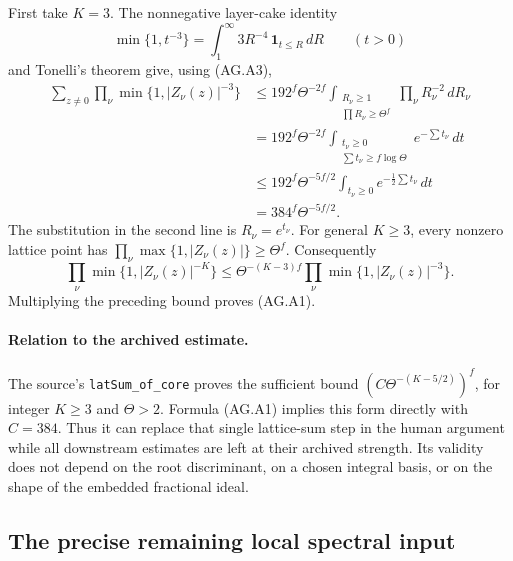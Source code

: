 First take \(K=3\).  The nonnegative layer-cake identity
\[
 \min\{1,t^{-3}\}=\int_1^\infty 3R^{-4}\,
                                      \mathbf1_{t\le R}\,dR
 \qquad(t>0)
\]
and Tonelli's theorem give, using (AG.A3),
\begin{align*}
 \sum_{z\ne0}\prod_\nu\min\{1,|Z_\nu(z)|^{-3}\}
 &\le 192^f\Theta^{-2f}
 \int_{\substack{R_\nu\ge1\\\prod R_\nu\ge\Theta^f}}
                         \prod_\nu R_\nu^{-2}\,dR_\nu\\
 &=192^f\Theta^{-2f}
 \int_{\substack{t_\nu\ge0\\\sum t_\nu\ge f\log\Theta}}
                            e^{-\sum t_\nu}\,dt\\
 &\le192^f\Theta^{-5f/2}
       \int_{t_\nu\ge0}e^{-\frac12\sum t_\nu}\,dt\\
 &=384^f\Theta^{-5f/2}.
\end{align*}
The substitution in the second line is \(R_\nu=e^{t_\nu}\).
For general \(K\ge3\), every nonzero lattice point has
\(\prod_\nu\max\{1,|Z_\nu(z)|\}\ge\Theta^f\).  Consequently
\[
 \prod_\nu\min\{1,|Z_\nu(z)|^{-K}\}
 \le \Theta^{-(K-3)f}
                   \prod_\nu\min\{1,|Z_\nu(z)|^{-3}\}.
\]
Multiplying the preceding bound proves (AG.A1).

\paragraph{Relation to the archived estimate.}
The source's \texttt{latSum\_of\_core} proves the sufficient
bound \((C\Theta^{-(K-5/2)})^f\), for integer \(K\ge3\)
and \(\Theta>2\).  Formula (AG.A1) implies this form directly
with \(C=384\).  Thus it can replace that single lattice-sum
step in the human argument while all downstream estimates are
left at their archived strength.  Its validity does not depend
on the root discriminant, on a chosen integral basis, or on the
shape of the embedded fractional ideal.

\subsection{The precise remaining local spectral input}
\label{app:ag-local}

